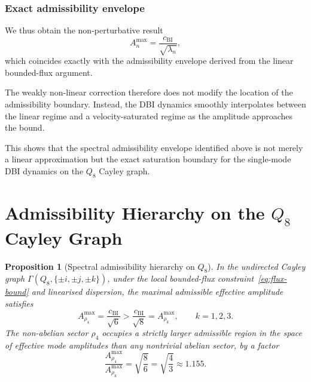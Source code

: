 \documentclass[11pt,a4paper]{article}
\newtheorem{proposition}{Proposition}
\begin{document}
  \subsubsection*{Exact admissibility envelope}

    We thus obtain the non-perturbative result
    \begin{equation}
      A_n^{\max}
      =
      \frac{c_{\mathrm{BI}}}{\sqrt{\lambda_n}},
    \end{equation}
    which coincides exactly with the admissibility envelope derived from the
    linear bounded-flux argument.

    The weakly non-linear correction therefore does not modify the
    location of the admissibility boundary.
    Instead, the DBI dynamics smoothly interpolates between the linear regime
    and a velocity-saturated regime as the amplitude approaches the bound.

    This shows that the spectral admissibility envelope identified above is not
    merely a linear approximation but the exact saturation boundary for the
    single-mode DBI dynamics on the $Q_8$ Cayley graph.
\section{Admissibility Hierarchy on the $Q_8$ Cayley Graph}
  \label{sec:admissibility-hierarchy-on-the-q_8-cayley-graph}

  \begin{proposition}[Spectral admissibility hierarchy on $Q_8$]
    \label{prop:main}
    In the undirected Cayley graph $\Gamma(Q_8, \{\pm i, \pm j, \pm k\})$,
    under the local bounded-flux constraint~\eqref{eq:flux-bound} and linearised
    dispersion, the maximal admissible effective amplitude satisfies
    \begin{equation}
      A^{\max}_{\rho_4} = \frac{c_{\mathrm{BI}}}{\sqrt{6}}
      >
      \frac{c_{\mathrm{BI}}}{\sqrt{8}}
      = A^{\max}_{\rho_k},
      \qquad
      k = 1,2,3.
    \end{equation}
    The non-abelian sector $\rho_4$ occupies a strictly larger admissible region in the
    space of effective mode amplitudes than any nontrivial abelian sector, by a factor
    \begin{equation}
      \frac{A^{\max}_{\rho_4}}{A^{\max}_{\rho_k}}
      =
      \sqrt{\frac{8}{6}}
      =
      \sqrt{\frac{4}{3}}
      \approx 1.155.
    \end{equation}
  \end{proposition}
\end{document}
